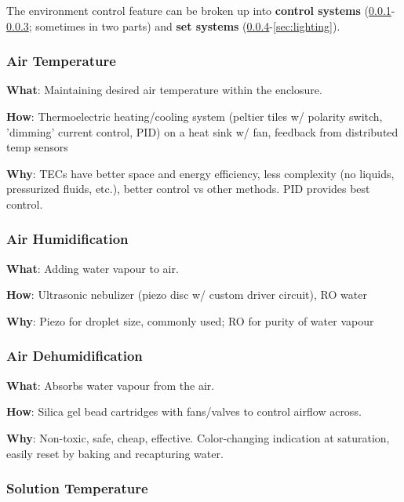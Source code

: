 \documentclass{report}
\begin{document}
The environment control feature can be broken up into \textbf{control systems} (\ref{sec:airtemp}-\ref{sec:dehum}; sometimes in two parts) and \textbf{set systems} (\ref{sec:watertemp}-\ref{sec:lighting}).

\subsubsection{Air Temperature}
\label{sec:airtemp}

\textbf{What}: Maintaining desired air temperature within the enclosure.

\textbf{How}: Thermoelectric heating/cooling system (peltier tiles w/ polarity switch, 'dimming' current control, PID) on a heat sink w/ fan, feedback from distributed temp sensors

\textbf{Why}: TECs have better space and energy efficiency, less complexity (no liquids, pressurized fluids, etc.), better control vs other methods. PID provides best control.

\subsubsection{Air Humidification}
\label{sec:airhum}

\textbf{What}: Adding water vapour to air.

\textbf{How}: Ultrasonic nebulizer (piezo disc w/ custom driver circuit), RO water

\textbf{Why}: Piezo for droplet size, commonly used; RO for purity of water vapour

\newpage

\subsubsection{Air Dehumidification}
\label{sec:dehum}

\textbf{What}: Absorbs water vapour from the air.

\textbf{How}: Silica gel bead cartridges with fans/valves to control airflow across.

\textbf{Why}: Non-toxic, safe, cheap, effective. Color-changing indication at saturation, easily reset by baking and recapturing water.

\subsubsection{Solution Temperature}
\label{sec:watertemp}
\end{document}
